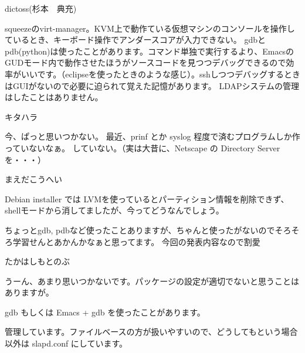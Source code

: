 \begin{prework}{ dictoss(杉本　典充) }

squeezeのvirt-manager。KVM上で動作ている仮想マシンのコンソールを操作しているとき、キーボード操作でアンダースコアが入力できない。
gdbとpdb(python)は使ったことがあります。コマンド単独で実行するより、EmacsのGUDモード内で動作させたほうがソースコードを見つつデバッグできるので効率がいいです。（eclipseを使ったときのような感じ）。sshしつつデバッグするときはGUIがないので必要に迫られて覚えた記憶があります。
LDAPシステムの管理はしたことはありません。
\end{prework}

\begin{prework}{ キタハラ }

 今、ぱっと思いつかない。
 最近、prinf とか syslog 程度で済むプログラムしか作っていないなぁ。
していない。（実は大昔に、Netscape の Directory Server を・・・）
\end{prework}

\begin{prework}{ まえだこうへい }

Debian installer では LVMを使っているとパーティション情報を削除できず、shellモードから消してましたが、今ってどうなんでしょう。

ちょっとgdb, pdbなど使ったことありますが、ちゃんと使ったがないのでそろそろ学習せんとあかんかなぁと思ってます。
今回の発表内容なので割愛
\end{prework}

\begin{prework}{ たかはしもとのぶ }


 うーん、あまり思いつかないです。パッケージの設定が適切でないと思うことはありますが。

  gdb もしくは Emacs + gdb を使ったことがあります。

  管理しています。ファイルベースの方が扱いやすいので、どうしてもという場合以外は slapd.conf にしています。
\end{prework}

